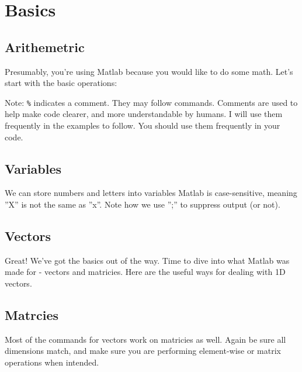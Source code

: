 
\pagebreak
\section{Basics}

\subsection{Arithemetric}
Presumably, you're using Matlab because you would like to do some math.
 Let's start with the basic operations:

\begin{quote}

\end{quote}
\noindent Note: \texttt{\%} indicates a comment.
 They may follow commands.
 Comments are used to help make code clearer, and more understandable by humans.
 I will use them frequently in the examples to follow.
 You should use them frequently in your code.

\pagebreak
\subsection{Variables}
We can store numbers and letters into variables
 Matlab is case-sensitive, meaning ''X'' is not the same as ''x''.
 Note how we use '';'' to suppress output (or not).

\begin{quote}

\end{quote}

\pagebreak
\subsection{Vectors}
Great! We've got the basics out of the way.
 Time to dive into what Matlab was made for - vectors and matricies.
 Here are the useful ways for dealing with 1D vectors.

\begin{quote}

\end{quote}

\pagebreak
\subsection{Matrcies}
Most of the commands for vectors work on matricies as well.
 Again be sure all dimensions match, and make sure you are performing element-wise or matrix operations when intended.

\begin{quote}

\end{quote}


